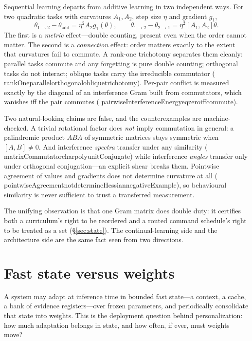 \documentclass[11pt]{article}
\newcommand{\leanname}[1]{{\scriptsize\ttfamily
  \def\_{\textunderscore\allowbreak}#1}}
\begin{document}
Sequential learning departs from additive learning in two independent ways. For two
quadratic tasks with curvatures $A_1,A_2$, step size $\eta$ and gradient $g_1$,
\[
\theta_{1\to2}-\theta_{\mathrm{add}}=\eta^{2}A_2 g_1(\theta),
\qquad
\theta_{1\to2}-\theta_{2\to1}=\eta^{2}[A_1,A_2]\theta .
\]
The first is a \emph{metric} effect---double counting, present even when the order cannot
matter. The second is a \emph{connection} effect: order matters exactly to the extent that
curvatures fail to commute. A rank-one trichotomy separates them cleanly: parallel tasks
commute and any forgetting is pure double counting; orthogonal tasks do not interact;
oblique tasks carry the irreducible commutator
(\leanname{rankOne\_parallel\_orthogonal\_oblique\_trichotomy}). Per-pair conflict is
measured exactly by the diagonal of an interference Gram built from commutators, which
vanishes iff the pair commutes
(\leanname{pairwiseInterferenceEnergy\_eq\_zero\_iff\_commute}).

Two natural-looking claims are false, and the counterexamples are machine-checked. A
trivial rotational factor does \emph{not} imply commutation in general: a palindromic
product $ABA$ of symmetric matrices stays symmetric when $[A,B]\neq0$. And interference
\emph{spectra} transfer under any similarity
(\leanname{matrixCommutator\_charpoly\_unitConjugate}) while interference \emph{angles}
transfer only under orthogonal conjugation---an explicit shear breaks them. Pointwise
agreement of values and gradients does not determine curvature at all
(\leanname{pointwiseAgreement\_not\_determineHessian\_negativeExample}), so behavioural
similarity is never sufficient to trust a transferred measurement.

The unifying observation is that one Gram matrix does double duty: it certifies both a
curriculum's right to be reordered and a routed command schedule's right to be treated as
a set (\S\ref{sec:state}). The continual-learning side and the architecture side are the
same fact seen from two directions.

\section{Fast state versus weights}
\label{sec:twotimescale}

A system may adapt at inference time in bounded fast state---a context, a cache, a bank of
evidence registers---over frozen parameters, and periodically consolidate that state into
weights. This is the deployment question behind personalization: how much adaptation
belongs in state, and how often, if ever, must weights move?
\end{document}
